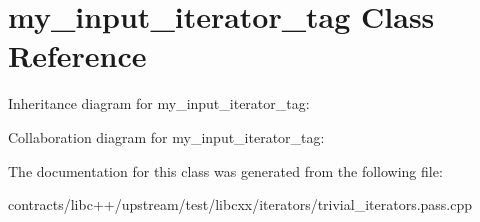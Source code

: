 \hypertarget{classmy__input__iterator__tag}{}\section{my\+\_\+input\+\_\+iterator\+\_\+tag Class Reference}
\label{classmy__input__iterator__tag}


Inheritance diagram for my\+\_\+input\+\_\+iterator\+\_\+tag\+:


Collaboration diagram for my\+\_\+input\+\_\+iterator\+\_\+tag\+:


The documentation for this class was generated from the following file\+:\begin{DoxyCompactItemize}
\item 
contracts/libc++/upstream/test/libcxx/iterators/trivial\+\_\+iterators.\+pass.\+cpp\end{DoxyCompactItemize}
